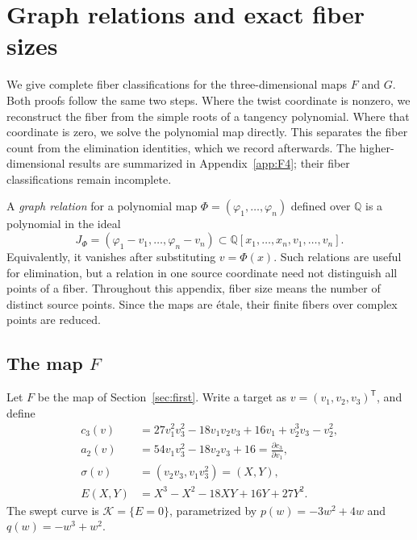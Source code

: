 \documentclass[11pt]{article}
\numberwithin{equation}{section}
\theoremstyle{plain}
\theoremstyle{definition}
\theoremstyle{remark}
\newcommand{\Q}{\mathbb{Q}}
\begin{document}
\clearpage
\appendix

\section{Graph relations and exact fiber sizes}\label{app:fibers}
We give complete fiber classifications for the three-dimensional maps $F$
and $G$. Both proofs follow the same two steps. Where the twist coordinate
is nonzero, we reconstruct the fiber from the simple roots of a tangency
polynomial. Where that coordinate is zero, we solve the polynomial map
directly. This separates the fiber count from the elimination identities,
which we record afterwards. The higher-dimensional results are summarized
in Appendix~\ref{app:F4}; their fiber classifications remain incomplete.

A \emph{graph relation} for a polynomial map
$\Phi=(\varphi_1,\ldots,\varphi_n)$ defined over $\Q$ is a polynomial in the ideal
\[
 J_\Phi=(\varphi_1-v_1,\ldots,\varphi_n-v_n)
 \subset\Q[x_1,\ldots,x_n,v_1,\ldots,v_n].
\]
Equivalently, it vanishes after substituting $v=\Phi(x)$. Such relations
are useful for elimination, but a relation in one source coordinate need
not distinguish all points of a fiber. Throughout this appendix, fiber
size means the number of distinct source points. Since the maps are
\'etale, their finite fibers over complex points are reduced.

\subsection{The map \texorpdfstring{$F$}{F}}\label{app:F}
Let $F$ be the map of Section~\ref{sec:first}. Write a target as
$v=(v_1,v_2,v_3)^{\mathsf T}$, and define
\begin{align*}
 c_3(v)&=27v_1^2v_3^2-18v_1v_2v_3+16v_1+v_2^3v_3-v_2^2,\\
 a_2(v)&=54v_1v_3^2-18v_2v_3+16=\frac{\partial c_3}{\partial v_1},\\
 \sigma(v)&=(v_2v_3,v_1v_3^2)=(X,Y),\\
 E(X,Y)&=X^3-X^2-18XY+16Y+27Y^2.
\end{align*}
The swept curve is $\mathcal K=\{E=0\}$, parametrized by
$p(w)=-3w^2+4w$ and $q(w)=-w^3+w^2$.
\end{document}
